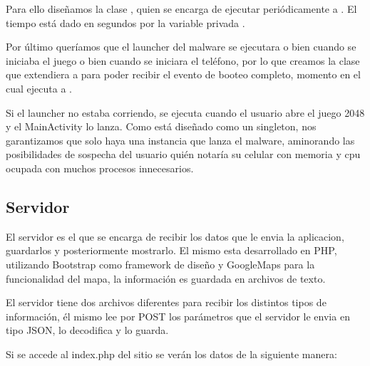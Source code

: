 Para ello dise\~namos la clase , quien se encarga de ejecutar peri\'odicamente a . El tiempo est\'a dado en segundos por la variable privada . 

Por \'ultimo quer\'iamos que el launcher del malware se ejecutara o bien cuando se iniciaba el juego o bien cuando se iniciara el tel\'efono, por lo que creamos la clase  que extendiera a  para poder recibir el evento de booteo completo, momento en el cual ejecuta a . 

Si el launcher no estaba corriendo, se ejecuta cuando el usuario abre el juego 2048 y el MainActivity lo lanza. Como  est\'a dise\~nado como un singleton, nos garantizamos que solo haya una instancia que lanza el malware, aminorando las posibilidades de sospecha del usuario qui\'en notar\'ia su celular con memoria y cpu ocupada con muchos procesos innecesarios. 


\subsection{Servidor}

El servidor es el que se encarga de recibir los datos que le envia la aplicacion, guardarlos y posteriormente mostrarlo. El mismo esta desarrollado en PHP, utilizando Bootstrap como framework de diseño y GoogleMaps para la funcionalidad del mapa, la información es guardada en archivos de texto.

El servidor tiene dos archivos diferentes para recibir los distintos tipos de información, él mismo lee por POST los parámetros que el servidor le envia en tipo JSON, lo decodifica y lo guarda.

Si se accede al index.php del sitio se ver\'an los datos de la siguiente manera:

